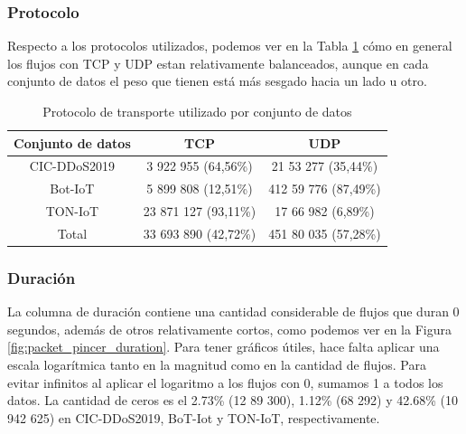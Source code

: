 \subsubsection{Protocolo}

Respecto a los protocolos utilizados, podemos ver en la Tabla \ref{table:packetpincerasprotocols} cómo en general los flujos con TCP y UDP estan relativamente balanceados, aunque en cada conjunto de datos el peso que tienen está más sesgado hacia un lado u otro.

\begin{table}[H]
    \centering
    \begin{tabular}{|c | c c |}
        \hline
        \textbf{Conjunto de datos} & \textbf{TCP}          & \textbf{UDP}         \\  \hline
        CIC-DDoS2019               &  3 922 955  (64,56\%) &  21 53 277 (35,44\%) \\
        Bot-IoT                    &  5 899 808  (12,51\%) & 412 59 776 (87,49\%) \\
        TON-IoT                    & 23 871 127  (93,11\%) &  17 66 982 (6,89\%)  \\
        Total                      & 33 693 890  (42,72\%) & 451 80 035 (57,28\%) \\
        \hline
    \end{tabular}
    \caption{Protocolo de transporte utilizado por conjunto de datos}
    \label{table:packetpincerasprotocols}
\end{table}

\subsubsection{Duración}

La columna de duración contiene una cantidad considerable de flujos que duran 0 segundos, además de otros relativamente cortos, como podemos ver en la Figura \ref{fig:packet_pincer_duration}. Para tener gráficos útiles, hace falta aplicar una escala logarítmica tanto en la magnitud como en la cantidad de flujos. Para evitar infinitos al aplicar el logaritmo a los flujos con 0, sumamos 1 a todos los datos. La cantidad de ceros es el 2.73\% (12 89 300), 1.12\% (68 292) y 42.68\% (10 942 625) en CIC-DDoS2019, BoT-Iot y TON-IoT, respectivamente.

